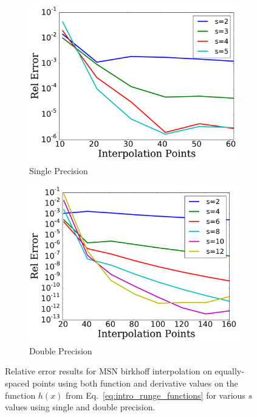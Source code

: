 \begin{figure}
\centering
    \begin{subfigure}{0.45\textwidth}
    \includegraphics[width=\textwidth]{plots/msn_birkhoff_1d_single.pdf}
    \caption{Single Precision}
    \end{subfigure}
    \begin{subfigure}{0.45\textwidth}
    \includegraphics[width=\textwidth]{plots/msn_birkhoff_1d_double.pdf}
    \caption{Double Precision}
    \end{subfigure}
\caption[MSN 1D Birkhoff Interpolation Relative Error]{
Relative error results for MSN birkhoff interpolation on equally-spaced points
using both function and derivative values on the function $h(x)$
from Eq.~\eqref{eq:intro_runge_functions}
for various $s$ values using single and double precision.}
\label{fig:intro_msn_birkhoff_1d}
\end{figure}

